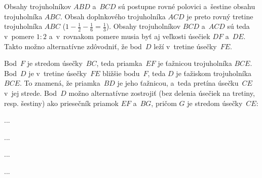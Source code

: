 {Obsahy trojuholníkov $ABD$ a~$BCD$ sú postupne rovné polovici a~šestine obsahu trojuholníka $ABC$.
Obsah doplnkového trojuholníka $ACD$ je preto rovný tretine trojuholníka $ABC$ ($1-\frac12-\frac16=\frac13$).
Obsahy trojuholníkov $BCD$ a~$ACD$ sú teda v~pomere $1:2$ a~v~rovnakom pomere musia byť aj veľkosti úsečiek $DF$ a~$DE$.
Takto možno alternatívne zdôvodniť, že bod~$D$ leží v~tretine úsečky~$FE$.

Bod~$F$ je stredom úsečky~$BC$, teda priamka~$EF$ je ťažnicou trojuholníka $BCE$.
Bod~$D$ je v~tretine úsečky~$FE$ bližšie bodu~$F$, teda $D$ je ťažiskom trojuholníka $BCE$.
To znamená, že priamka~$BD$ je jeho ťažnicou, a~teda pretína úsečku~$CE$ v~jej strede.
Bod~$D$ možno alternatívne zostrojiť (bez delenia úsečiek na tretiny, resp. šestiny) ako priesečník priamok $EF$ a~$BG$, pričom $G$ je stredom úsečky~$CE$:
%

\eres
}

{%
...}

{%
...}

{%
...}

{%
...}

